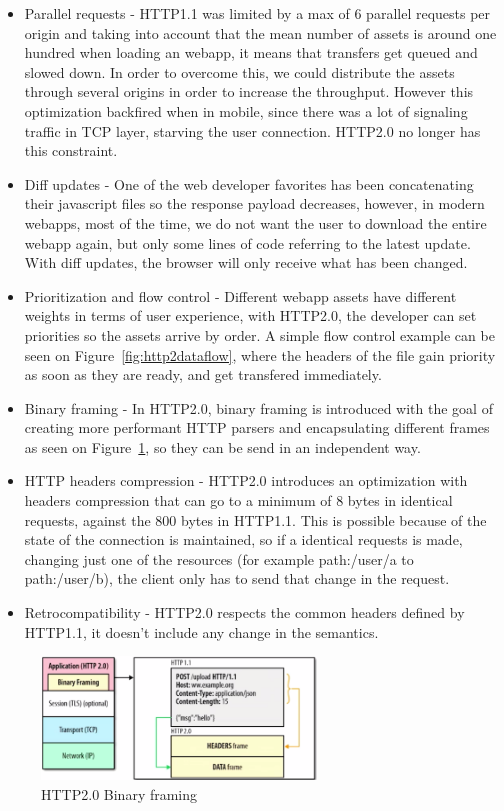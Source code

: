 \begin{itemize}
  \item Parallel requests - HTTP1.1 was limited by a max of 6 parallel requests per origin and taking into account that the mean number of assets is around one hundred when loading an webapp, it means that transfers get queued and slowed down. In order to overcome this, we could distribute the assets through several origins in order to increase the throughput. However this optimization backfired when in mobile, since there was a lot of signaling traffic in TCP layer, starving the user connection. HTTP2.0 no longer has this constraint.
  \item Diff updates - One of the web developer favorites has been concatenating their javascript files so the response payload decreases, however, in modern webapps, most of the time, we do not want the user to download the entire webapp again, but only some lines of code referring to the latest update. With diff updates, the browser will only receive what has been changed.
  \item Prioritization and flow control - Different webapp assets have different weights in terms of user experience, with HTTP2.0, the developer can set priorities so the assets arrive by order.  A simple flow control example can be seen on Figure~\ref{fig:http2dataflow}, where the headers of the file gain priority as soon as they are ready, and get transfered immediately. 
  \item Binary framing - In HTTP2.0, binary framing is introduced with the goal of creating more performant HTTP parsers and encapsulating different frames as seen on Figure~\ref{fig:binaryframing}, so they can be send in an independent way.
  \item HTTP headers compression - HTTP2.0 introduces an optimization with headers compression\cite{Ruellan2013} that can go to a minimum of 8 bytes in identical requests, against the 800 bytes in HTTP1.1. This is possible because of the state of the connection is maintained, so if a identical requests is made, changing just one of the resources (for example path:/user/a to path:/user/b), the client only has to send that change in the request.
  \item Retrocompatibility - HTTP2.0 respects the common headers defined by HTTP1.1, it doesn't include any change in the semantics.
\end{itemize}

\begin{figure}[h!]
  \centering
  \includegraphics[width=0.65\textwidth]{img/http2binaryframing.png}
  \caption{HTTP2.0 Binary framing}
  \label{fig:binaryframing}
\end{figure}

